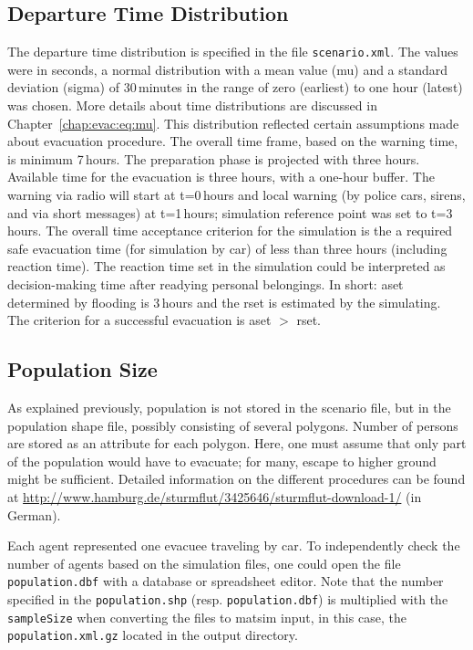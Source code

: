 \subsection{Departure Time Distribution}
The departure time distribution is specified in the file  \lstinline|scenario.xml|. The values were in seconds, \ie a normal distribution with a mean value (mu) and a standard deviation (sigma) of 30\,minutes in the range of zero (earliest) to one hour (latest) was chosen. 
More details about time distributions are discussed in Chapter~\ref{chap:evac:eq:mu}. This distribution reflected certain assumptions made about evacuation procedure. The overall time frame, based on the warning time, is minimum 7\,hours. The preparation phase is projected with three hours. Available time for the evacuation is three hours, with a one-hour buffer. 
The warning via radio will start at t=0\,hours and local warning (\eg by police cars, sirens, and via short messages) at t=1\,hours; simulation reference point was set to t=3\,hours. The overall time acceptance criterion for the simulation is the a required safe evacuation time (for simulation by car) of less than three hours (including reaction time). The reaction time set in the simulation could be interpreted as decision-making time after readying personal belongings. In short: \gls{aset} determined by flooding is 3\,hours and the \gls{rset} is estimated by the simulating. The criterion for a successful evacuation is \gls{aset} $>$ \gls{rset}.

\subsection{Population Size}
As explained previously, population is not stored in the scenario file, but in the population shape file, possibly consisting of several polygons. Number of persons are stored as an attribute for each polygon. Here, one must assume that only part of the population would have to evacuate; for many, escape to higher ground might be sufficient. Detailed information on the different procedures can be found at \url{http://www.hamburg.de/sturmflut/3425646/sturmflut-download-1/} (in German).

Each agent represented one evacuee traveling by car. To independently check the number of agents based on the simulation files, one could open the file \lstinline|population.dbf| with a database or spreadsheet editor. Note that the number specified in the \lstinline|population.shp| (resp. \lstinline|population.dbf|) is multiplied with the \lstinline|sampleSize| when converting the files to \gls{matsim} input, \ie in this case, the \lstinline|population.xml.gz| located in the output directory.

